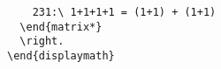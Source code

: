 \begin{lstlisting}
    231:\ 1+1+1+1 = (1+1) + (1+1)                                                                                                                                                                                                                                                                                              
  \end{matrix*}                                                                                                                                                                                                                                                                                                                
  \right.                                                                                                                                                                                                                                                                                                                      
\end{displaymath}                                                                                                                                                                                                                                                                                                              
\end{lstlisting}  